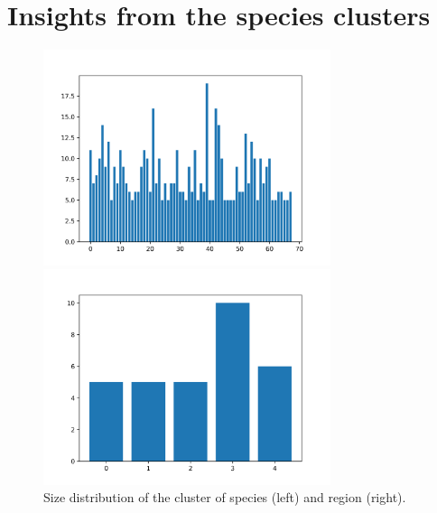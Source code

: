 \documentclass[mscthesis]{usiinfthesis}
\begin{document}
\section{Insights from the species clusters}

\begin{figure}[H] 
  \label{ fig7} 
  \begin{minipage}[b]{0.5\linewidth}
    \centering
        \includegraphics[width=0.75\textwidth]{cluster_distribution_species.png}
    \vspace{4ex}
  \end{minipage}%
  \begin{minipage}[b]{0.5\linewidth}
    \centering
     \includegraphics[width=0.75\textwidth]{cluster_distribution_region.png}
    \vspace{4ex}
  \end{minipage} 
\caption{Size distribution of the cluster of species (left) and region (right).}
\label{fig:cluster_density}
\end{figure}
\end{document}
